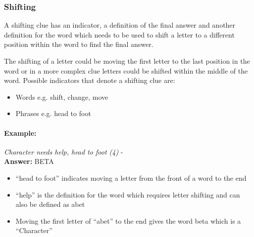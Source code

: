 \subsubsection{Shifting}

A shifting clue has an indicator, a definition of the final answer and another
definition for the word which needs to be used to shift a letter to a different
position within the word to find the final answer.

The shifting of a letter could be moving the first letter to the last position
in the word or in a more complex clue letters could be shifted within the middle
of the word. Possible  indicators that denote a shifting clue are:

\begin{itemize} 
    \item Words e.g. shift, change, move 
    \item Phrases e.g. head to foot 
\end{itemize}

\paragraph{Example:} \emph{Character needs help, head to foot (4)} - \citep{shuchiShifting09} \\
\textbf{Answer:} BETA 

\begin{itemize}
    \item ``head to foot'' indicates moving a letter from the front of a word 
    to the end 
    \item ``help'' is the definition for the word which requires letter 
    shifting and can also be defined as abet 
    \item Moving the first letter of ``abet'' to the end gives the word beta 
    which is a ``Character''
\end{itemize}